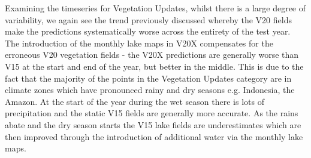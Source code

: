 \documentclass[twocolumn]{article}
\begin{document}
	
	
	\noindent Examining the timeseries for Vegetation Updates, whilst there is a large degree of variability, we again see the trend previously discussed whereby the V20 fields make the predictions systematically worse across the entirety of the test year. The introduction of the monthly lake maps in V20X compensates for the erroneous V20 vegetation fields - the V20X predictions are generally worse than V15 at the start and end of the year, but better in the middle. This is due to the fact that the majority of the points in the Vegetation Updates category are in climate zones which have pronounced rainy and dry seasons e.g. Indonesia, the Amazon. At the start of the year during the wet season there is lots of precipitation and the static V15 fields are generally more accurate. As the rains abate and the dry season starts the V15 lake fields are underestimates which are then improved through the introduction of additional water via the monthly lake maps. \newline 
	
	
	
\end{document}
